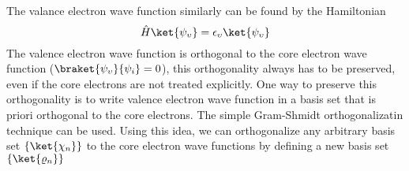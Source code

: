The valance electron wave function similarly can be found by the Hamiltonian
\begin{equation}
\label{eq_val_hamil}
\hat{H}\ket{\psi_{\upsilon}} = \epsilon_{\upsilon} \ket{\psi_{\upsilon}}
\end{equation}
The valence electron wave function is orthogonal to the core electron wave function ($\braket{\psi_{\upsilon}}{\psi_i}=0$), this orthogonality always has to be preserved, even if the core electrons are not treated explicitly. One way to preserve this orthogonality is to write valence electron wave function in a basis set that is priori orthogonal to the core electrons. The simple Gram-Shmidt orthogonalizatin technique can be used. Using this idea, we can orthogonalize any arbitrary basis set $\{\ket{\chi_n}\}$ to the core electron wave functions by defining a new basis set $\{\ket{\varrho_n}\}$

